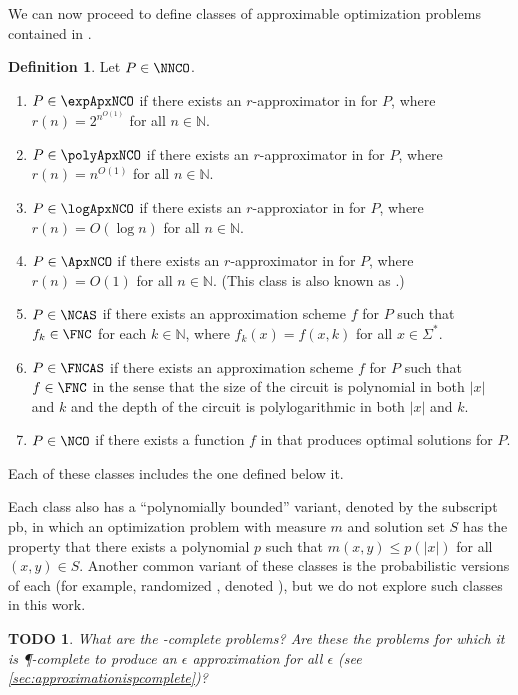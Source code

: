 \documentclass[]{article}
\theoremstyle{plain}
\newtheorem{todo}{TODO}
\theoremstyle{definition}
\newtheorem{definition}{Definition}
\newcommand{\pb}{\textsf{pb}}
\begin{document}
We can now proceed to define classes of approximable optimization problems contained in \NNCO.

\begin{definition}\label{def:ncx}
  Let $P\in\NNCO$.
  \begin{enumerate}
  \item $P\in\expApxNCO$ if there exists an $r$-approximator in \FNC{} for $P$, where $r(n)=2^{n^{O(1)}}$ for all $n\in\mathbb{N}$.
  \item $P\in\polyApxNCO$ if there exists an $r$-approximator in \FNC{} for $P$, where $r(n)=n^{O(1)}$ for all $n\in\mathbb{N}$.
  \item $P\in\logApxNCO$ if there exists an $r$-approxiator in \FNC{} for $P$, where $r(n)=O(\log n)$ for all $n\in\mathbb{N}$.
  \item $P\in\ApxNCO$ if there exists an $r$-approximator in \FNC{} for $P$, where $r(n)=O(1)$ for all $n\in\mathbb{N}$.
    (This class is also known as \NCX.)
  \item $P\in\NCAS$ if there exists an approximation scheme $f$ for $P$ such that $f_k\in\FNC$ for each $k\in\mathbb{N}$, where $f_k(x)=f(x, k)$ for all $x\in\Sigma^*$.
  \item $P\in\FNCAS$ if there exists an approximation scheme $f$ for $P$ such that $f\in\FNC$ in the sense that the size of the circuit is polynomial in both $|x|$ and $k$ and the depth of the circuit is polylogarithmic in both $|x|$ and $k$.
  \item $P\in\NCO$ if there exists a function $f$ in \FNC{} that produces optimal solutions for $P$.
  \end{enumerate}
\end{definition}

Each of these classes includes the one defined below it.

Each class also has a ``polynomially bounded'' variant, denoted by the subscript \pb, in which an optimization problem with measure $m$ and solution set $S$ has the property that there exists a polynomial $p$ such that $m(x, y) \leq p(|x|)$ for all $(x, y)\in S$.
Another common variant of these classes is the probabilistic versions of each (for example, randomized \NCAS{}, denoted \RNCAS), but we do not explore such classes in this work.

\begin{todo}
  What are the \PO-complete problems?
  Are these the problems for which it is \P-complete to produce an $\epsilon$ approximation for all $\epsilon$ (see \autoref{sec:approximationispcomplete})?
\end{todo}
\end{document}
